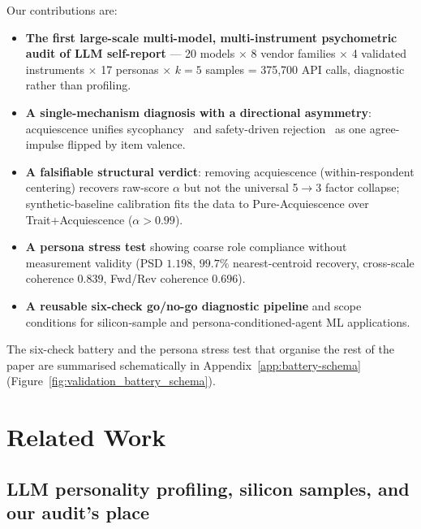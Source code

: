 \documentclass{article}
\begin{document}
Our contributions are:
\begin{itemize}\setlength\itemsep{0pt}
  \item \textbf{The first large-scale multi-model, multi-instrument psychometric audit of LLM self-report} --- 20 models $\times$ 8 vendor families $\times$ 4 validated instruments $\times$ 17 personas $\times$ $k{=}5$ samples = 375{,}700 API calls, diagnostic rather than profiling.
  \item \textbf{A single-mechanism diagnosis with a directional asymmetry}: acquiescence unifies sycophancy~\citep{perez2023discovering,sharma2024sycophancy} and safety-driven rejection~\citep{bai2022constitutional} as one agree-impulse flipped by item valence.
  \item \textbf{A falsifiable structural verdict}: removing acquiescence (within-respondent centering) recovers raw-score $\alpha$ but not the universal 5$\to$3 factor collapse; synthetic-baseline calibration fits the data to Pure-Acquiescence over Trait+Acquiescence ($\alpha{>}0.99$).
  \item \textbf{A persona stress test} showing coarse role compliance without measurement validity (PSD $1.198$, $99.7\%$ nearest-centroid recovery, cross-scale coherence $0.839$, Fwd/Rev coherence $0.696$).
  \item \textbf{A reusable six-check go/no-go diagnostic pipeline} and scope conditions for silicon-sample and persona-conditioned-agent ML applications.
\end{itemize}

\noindent The six-check battery and the persona stress test that organise the rest of the paper are summarised schematically in Appendix~\ref{app:battery-schema} (Figure~\ref{fig:validation_battery_schema}).

\section{Related Work}
\label{sec:related}

\subsection{LLM personality profiling, silicon samples, and our audit's place}
\label{sec:related-profiling}
\end{document}
